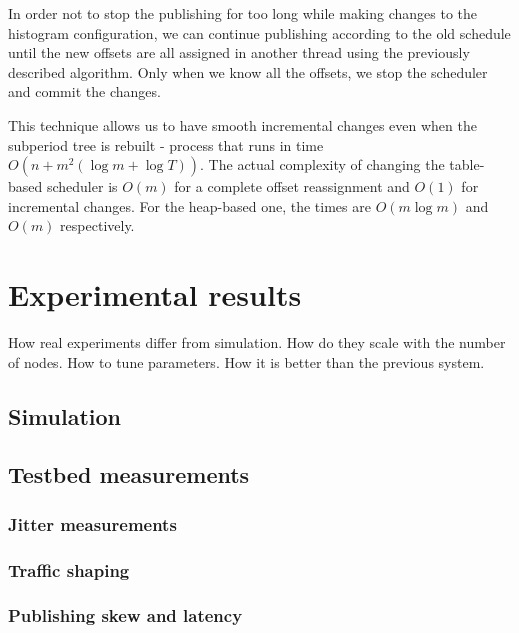 In order not to stop the publishing for too long while making changes to the histogram configuration, we can continue publishing according to the old schedule until the new offsets are all assigned in another thread using the previously described algorithm. Only when we know all the offsets, we stop the scheduler and commit the changes.

This technique allows us to have smooth incremental changes even when the subperiod tree is rebuilt - process that runs in time $O(n+m^2(\log m+\log T))$. The actual complexity of changing the table-based scheduler is $O(m)$ for a complete offset reassignment and $O(1)$ for incremental changes. For the heap-based one, the times are $O(m\log m)$ and $O(m)$ respectively.

\section*{Experimental results}
How real experiments differ from simulation.
How do they scale with the number of nodes.
How to tune parameters.
How it is better than the previous system.

\subsection*{Simulation}

\subsection*{Testbed measurements}
\subsubsection*{Jitter measurements}
\subsubsection*{Traffic shaping}
\subsubsection*{Publishing skew and latency}


